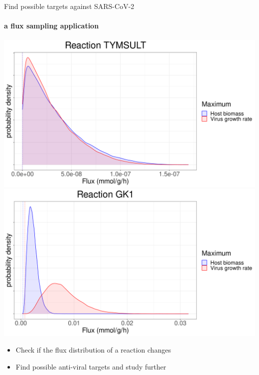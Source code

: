 \documentclass{beamer}
\begin{document}
   \begin{frame}{Find possible targets against SARS-CoV-2}
      \framesubtitle{a flux sampling application}      



      \centerline{
      \includegraphics[scale=0.21]{
         ../resources/density_flux_TYMSULT_fba_2_transparent
         } 
      \includegraphics[scale=0.21]{
         ../resources/density_flux_gk1_fba_2_transparent
         }
      }

      \begin{itemize}
         \item Check if the flux distribution of a reaction changes
         \item Find possible anti-viral targets and study further
      \end{itemize}
      \vspace*{0.2cm}

   \end{frame}
   
\end{document}
